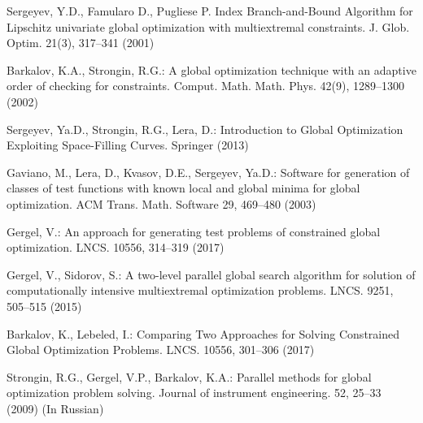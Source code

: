 \documentclass[smallextended]{svjour3}       %
\begin{document}
\begin{thebibliography}{}



Sergeyev, Y.D., Famularo D., Pugliese P. Index Branch-and-Bound Algorithm for Lipschitz univariate global optimization with multiextremal constraints. J. Glob. Optim. 21(3), 317--341 (2001) 

Barkalov, K.A., Strongin, R.G.: A global optimization technique with an adaptive order of checking for constraints. Comput. Math. Math. Phys. 42(9), 1289--1300 (2002)

Sergeyev, Ya.D., Strongin, R.G., Lera, D.: Introduction to Global Optimization Exploiting Space-Filling Curves. Springer (2013)

Gaviano, M., Lera, D., Kvasov, D.E., Sergeyev, Ya.D.: Software for generation of classes of test functions with known local and global minima for global optimization. ACM Trans. Math. Software 29, 469--480 (2003)

Gergel, V.: An approach for generating test problems of constrained global optimization. LNCS. 10556, 314--319 (2017)


Gergel, V., Sidorov, S.: A two-level parallel global search algorithm for solution of computationally intensive multiextremal optimization problems. LNCS. 9251, 505--515 (2015)

Barkalov, K., Lebeled, I.: Comparing Two Approaches for Solving Constrained Global Optimization Problems. LNCS. 10556, 301--306 (2017)

Strongin, R.G., Gergel, V.P., Barkalov, K.A.: Parallel methods for global optimization problem solving. Journal of instrument engineering. 52, 25--33 (2009) (In Russian)



%
\end{thebibliography}
\end{document}

